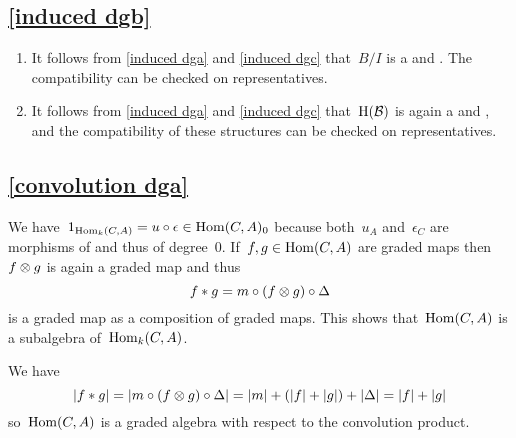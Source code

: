 \subsection{\cref{induced dgb}}
\label{induced dgb proof}

\begin{enumerate}
  \item
    It follows from \cref{induced dga} and \cref{induced dgc} that~$B/I$ is a {\dga} and {\dgc}.
    The compatibility can be checked on representatives.
  \item
    It follows from \cref{induced dga} and \cref{induced dgc} that~$\operatorname{H}(\mathcal{B})$ is again a {\dga} and {\dgc}, and the compatibility of these structures can be checked on representatives.
\end{enumerate}





\subsection{\cref{convolution dga}}
\label{convolution dga proof}

We have~$1_{\operatorname{Hom}_k(C,A)} = u \circ \epsilon \in \operatorname{Hom}(C,A)_0$ because both~$u_A$ and~$\epsilon_C$ are morphisms of {\dgvs} and thus of degree~$0$.
If~$f, g \in \operatorname{Hom}(C,A)$ are graded maps then~$f \otimes g$ is again a graded map and thus
\[
  f * g
  =
  m \circ (f \otimes g) \circ \Delta
\]
is a graded map as a composition of graded maps.
This shows that~$\operatorname{Hom}(C,A)$ is a subalgebra of~$\operatorname{Hom}_k(C,A)$.

We have
\[
  \lvert f * g\rvert
  =
  \lvert m \circ (f \otimes g) \circ \Delta\rvert
  =
  \lvert m\rvert + (\lvert f\rvert + \lvert g\rvert) + \lvert\Delta\rvert
  =
  \lvert f\rvert + \lvert g\rvert
\]
so~$\operatorname{Hom}(C,A)$ is a graded algebra with respect to the convolution product.

